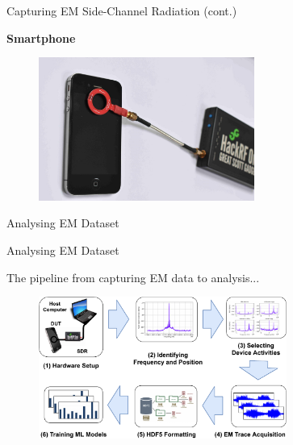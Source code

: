 \documentclass[handout]{beamer}
\begin{document}
\begin{frame}{Capturing EM Side-Channel Radiation (cont.)}  

\footnotesize
\textbf{Smartphone}

	\begin{figure}
		\includegraphics[width=200pt]{figures/iphone-hackrf.png}
	\end{figure}

\end{frame}



\begin{frame}{}  

	\begin{block}{Analysing EM Dataset}
	\end{block}

\end{frame}

\begin{frame}{Analysing EM Dataset}  

\footnotesize
The pipeline from capturing EM data to analysis...

	\begin{figure}
		\includegraphics[width=230pt]{figures/sdr-data-pipeline-V2.pdf}
	\end{figure}

\end{frame}
\end{document}
